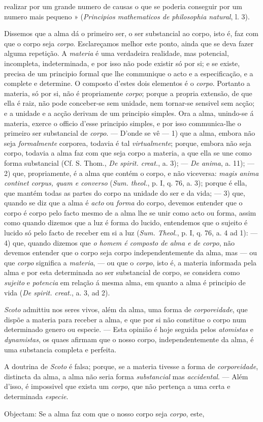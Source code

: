 realizar por um grande numero de causas o que se poderia conseguir por um numero mais pequeno » (\emph{Principios mathematicos de philosophia natural}, l. 3).\par Dissemos que a alma dá o primeiro ser, o ser substancial ao corpo, isto é, faz com que o corpo seja \emph{corpo}. Esclareçamos melhor este ponto, ainda que se deva fazer alguma repetição. A \emph{materia} é uma verdadeira realidade, mas potencial, incompleta, indeterminada, e por isso não pode existir só por si; e se existe, precisa de um principio formal que lhe communique o acto e a especificação, e a complete e determine. O composto d'estes dois elementos é o \emph{corpo}. Portanto a materia, só por si, não é propriamente \emph{corpo}; porque a propria extensão, de que ella é raiz, não pode conceber-se sem unidade, nem tornar-se sensivel sem acção; e a unidade e a acção derivam de um principio simples. Ora a alma, unindo-se á materia, exerce o officio d'esse principio simples, e por isso communica-lhe o primeiro ser substancial de \emph{corpo}. --- D'onde se vê --- 1) que a alma, embora não seja \emph{formalmente} corporea, todavia é tal \emph{virtualmente}; porque, embora não seja corpo, todavia a alma faz com que seja corpo a materia, a que ella se une como forma substancial (Cf. S. Thom., \emph{De spirit. creat.}, a. 3); --- \emph{De anima}, a. 11); --- 2) que, propriamente, é a alma que contém o corpo, e não viceversa: \emph{magis anima continet corpus, quam e converso} (\emph{Sum. theol.}, p. I, q. 76, a. 3); porque é ella, que mantém todas as partes do corpo na unidade do ser e da vida; --- 3) que, quando se diz que a alma é \emph{acto} ou \emph{forma} do corpo, devemos entender que o corpo é corpo pelo facto mesmo de a alma lhe se unir como acto ou forma, assim como quando dizemos que a luz é forma do lucido, entendemos que o sujeito é lucido só pelo facto de receber em si a luz (\emph{Sum. Theol.}, p. I, q. 76, a. 4 ad 1): --- 4) que, quando dizemos que \emph{o homem é composto de alma e de corpo}, não devemos entender que o corpo seja corpo independentemente da alma, mas --- ou que \emph{corpo} significa a \emph{materia}, --- ou que o \emph{corpo}, isto é, a materia informada pela alma e por esta determinada ao ser substancial de corpo, se considera como \emph{sujeito} e \emph{potencia} em relação á mesma alma, em quanto a alma é principio de vida (\emph{De spirit. creat.}, a. 3, ad 2).\par \emph{Scoto} admittiu nos seres vivos, além da alma, uma forma de \emph{corporeidade}, que dispõe a materia para receber a alma, e que por si não constitue o corpo num determinado genero ou especie. --- Esta opinião é hoje seguida pelos \emph{atomistas} e \emph{dynamistas}, os quaes afirmam que o nosso corpo, independentemente da alma, é uma substancia completa e perfeita.\par A doutrina de \emph{Scoto} é falsa; porque, se a materia tivesse a forma de \emph{corporeidade}, distincta da alma, a alma não seria forma \emph{substancial} mas \emph{accidental}. --- Além d'isso, é impossivel que exista um \emph{corpo}, que não pertença a uma certa e determinada \emph{especie}.\par Objectam: Se a alma faz com que o nosso corpo seja \emph{corpo}, este, 